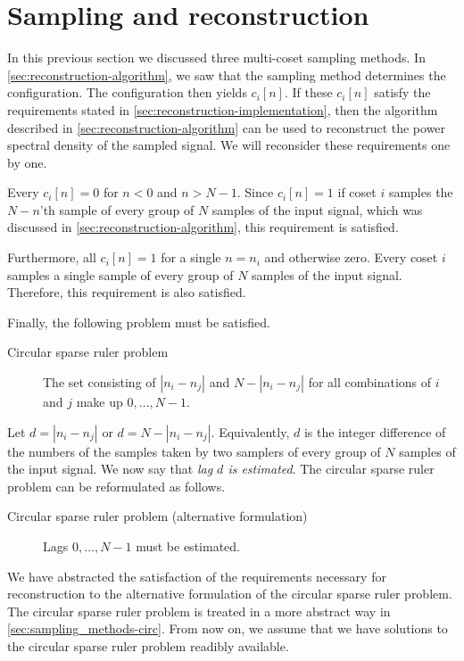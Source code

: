 \documentclass[a4paper, openany, oneside]{memoir}
\begin{document}
\section{Sampling and reconstruction}
In this previous section we discussed three multi-coset sampling methods. In \cref{sec:reconstruction-algorithm}, we saw that the sampling method determines the configuration. The configuration then yields $c_i[n]$. If these $c_i[n]$ satisfy the requirements stated in \cref{sec:reconstruction-implementation}, then the algorithm described in \cref{sec:reconstruction-algorithm} can be used to reconstruct the power spectral density of the sampled signal. We will reconsider these requirements one by one.

Every $c_i[n]=0$ for $n < 0$ and $n > N-1$. Since $c_i[n]=1$ if coset $i$ samples the $N-n$'th sample of every group of $N$ samples of the input signal, which was discussed in \cref{sec:reconstruction-algorithm}, this requirement is satisfied.

Furthermore, all $c_i[n]=1$ for a single $n=n_i$ and otherwise zero. Every coset $i$ samples a single sample of every group of $N$ samples of the input signal. Therefore, this requirement is also satisfied.

Finally, the following problem must be satisfied.

\begin{description}
    \item[Circular sparse ruler problem] The set consisting of $|n_i - n_j|$ and $N-|n_i-n_j|$ for all combinations of $i$ and $j$ make up $0,\ldots,N-1$.
\end{description}

Let $d=|n_i - n_j|$ or $d=N-|n_i-n_j|$. Equivalently, $d$ is the integer difference of the numbers of the samples taken by two samplers of every group of $N$ samples of the input signal. We now say that \textit{lag $d$ is estimated}. The circular sparse ruler problem can be reformulated as follows.

\begin{description}
    \item[Circular sparse ruler problem (alternative formulation)] Lags $0,\ldots,N-1$ must be estimated.
\end{description}

We have abstracted the satisfaction of the requirements necessary for reconstruction to the alternative formulation of the circular sparse ruler problem. The circular sparse ruler problem is treated in a more abstract way in \cref{sec:sampling_methods-circ}. From now on, we assume that we have solutions to the circular sparse ruler problem readibly available.
\end{document}
